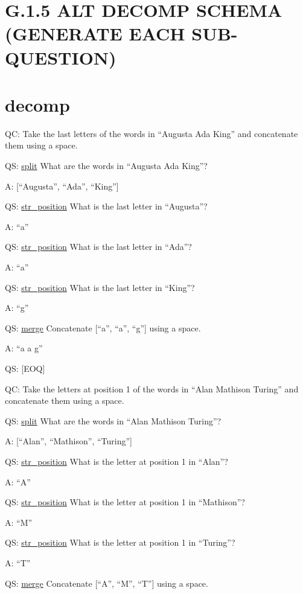 \documentclass[
]{article}
\begin{document}
\section{G.1.5 ALT DECOMP SCHEMA (GENERATE EACH
SUB-QUESTION)}\label{g.1.5-alt-decomp-schema-generate-each-sub-question}

\section{decomp}\label{decomp-1}

QC: Take the last letters of the words in ``Augusta Ada King'' and
concatenate them using a space.

QS: \hyperref[split]{split} What are the words in ``Augusta Ada King''?

A: {[}``Augusta'', ``Ada'', ``King''{]}

QS: \hyperref[str_position]{str\_position} What is the last letter in
``Augusta''?

A: ``a''

QS: \hyperref[str_position]{str\_position} What is the last letter in
``Ada''?

A: ``a''

QS: \hyperref[str_position]{str\_position} What is the last letter in
``King''?

A: ``g''

QS: \hyperref[merge]{merge} Concatenate {[}``a'', ``a'', ``g''{]} using
a space.

A: ``a a g''

QS: {[}EOQ{]}

QC: Take the letters at position 1 of the words in ``Alan Mathison
Turing'' and concatenate them using a space.

QS: \hyperref[split]{split} What are the words in ``Alan Mathison
Turing''?

A: {[}``Alan'', ``Mathison'', ``Turing''{]}

QS: \hyperref[str_position]{str\_position} What is the letter at
position 1 in ``Alan''?

A: ``A''

QS: \hyperref[str_position]{str\_position} What is the letter at
position 1 in ``Mathison''?

A: ``M''

QS: \hyperref[str_position]{str\_position} What is the letter at
position 1 in ``Turing''?

A: ``T''

QS: \hyperref[merge]{merge} Concatenate {[}``A'', ``M'', ``T''{]} using
a space.
\end{document}
